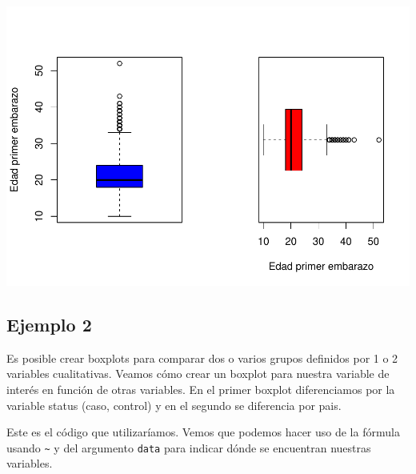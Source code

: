 \documentclass[
]{book}
\begin{document}
\includegraphics{fig/unnamed-chunk-78-1.pdf}

\hypertarget{ejemplo-2-1}{%
\subsection*{Ejemplo 2}\label{ejemplo-2-1}}

Es posible crear boxplots para comparar dos o varios grupos definidos por 1 o 2 variables cualitativas. Veamos cómo crear un boxplot para nuestra variable de interés en función de otras variables. En el primer boxplot diferenciamos por la variable status (caso, control) y en el segundo se diferencia por pais.

Este es el código que utilizaríamos. Vemos que podemos hacer uso de la fórmula usando \texttt{\textasciitilde{}} y del argumento \texttt{data} para indicar dónde se encuentran nuestras variables.
\end{document}
